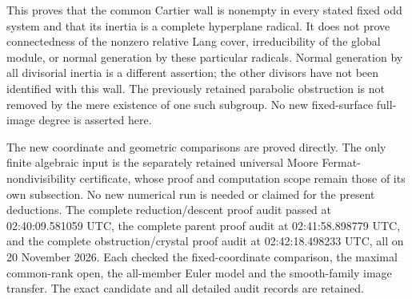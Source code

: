\begin{remark}
\label{rem:odd-full-hyperplane-inertia-scope}
This proves that the common Cartier wall is nonempty in every
stated fixed odd system and that its inertia is a complete
hyperplane radical.  It does not prove connectedness of the
nonzero relative Lang cover, irreducibility of the global module,
or normal generation by these particular radicals.  Normal
generation by all divisorial inertia is a different assertion;
the other divisors have not been identified with this wall.
The previously retained parabolic obstruction is not removed by
the mere existence of one such subgroup.  No new fixed-surface
full-image degree is asserted here.

The new coordinate and geometric comparisons are proved directly.
The only finite algebraic input is the separately retained universal
Moore Fermat-nondivisibility certificate, whose proof and computation
scope remain those of its own subsection.  No new numerical run
is needed or claimed for the present deductions.  The complete
reduction/descent proof audit passed at 02:40:09.581059 UTC,
the complete parent proof audit at 02:41:58.898779 UTC, and
the complete obstruction/crystal proof audit at 02:42:18.498233 UTC,
all on 20 November 2026.  Each checked the fixed-coordinate
comparison, the maximal common-rank open, the all-member Euler
model and the smooth-family image transfer.  The exact candidate
and all detailed audit records are retained.
\end{remark}
